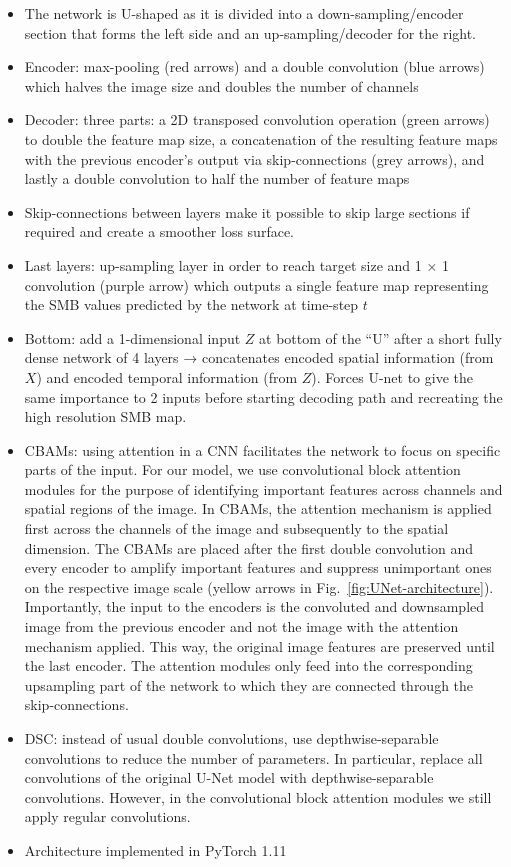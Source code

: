 \documentclass[a4paper,11pt,oneside]{report}
\begin{document}
\begin{itemize}
    \item The network is U-shaped as it is divided into a down-sampling/encoder section that forms the left side and an up-sampling/decoder for the right.
    \item Encoder: max-pooling (red arrows) and a double convolution (blue arrows) which halves the image size and doubles the number of channels
    \item Decoder: three parts: a 2D transposed convolution operation (green arrows) to double the feature map size, a concatenation of the resulting feature maps with the previous encoder’s output via skip-connections (grey arrows), and lastly a double convolution to half the number of feature maps
    \item  Skip-connections between layers make it possible to skip large sections if required and create a smoother loss surface. 
    \item  Last layers: up-sampling layer in order to reach target size and 1 × 1 convolution (purple arrow) which outputs a single feature map representing the SMB values predicted by the network at time-step $t$
    \item Bottom: add a 1-dimensional input $Z$ at bottom of the “U” after a short fully dense network of 4 layers → concatenates encoded spatial information (from $X$) and encoded temporal information (from $Z$). Forces U-net to give the same importance to 2 inputs before starting decoding path and recreating the high resolution SMB map. 
    \item CBAMs: using attention in a CNN facilitates the network to focus on specific parts of the input. For our model, we use convolutional block attention modules for the purpose of identifying important features across channels and spatial regions of the image. In CBAMs, the attention mechanism is applied first across the channels of the image and subsequently to the spatial dimension. The CBAMs are placed after the first double convolution and every encoder to amplify important features and suppress unimportant ones on the respective image scale (yellow arrows in Fig.~\ref{fig:UNet-architecture}). Importantly, the input to the encoders is the convoluted and downsampled image from the previous encoder and not the image with the attention mechanism applied. This way, the original image features are preserved until the last encoder. The attention modules only feed into the corresponding upsampling part of the network to which they are connected through the skip-connections.
    \item DSC: instead of usual double convolutions, use depthwise-separable convolutions to reduce the number of parameters. In particular, replace all convolutions of the original U-Net model with depthwise-separable convolutions. However, in the convolutional block attention modules we still apply regular convolutions. 
    \item Architecture implemented in PyTorch 1.11
\end{itemize}
\end{document}
